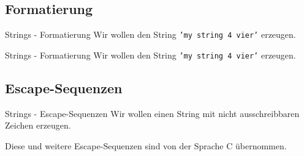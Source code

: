 \subsection{Formatierung}
\begin{frame}[fragile]{Strings - Formatierung}
	Wir wollen den String \alert{\texttt{'my string 4 vier'}} erzeugen.

	
\end{frame}

\begin{frame}[fragile]{Strings - Formatierung}
	Wir wollen den String \alert{\texttt{'my string 4 vier'}} erzeugen.
	
\end{frame}


\subsection{Escape-Sequenzen}
\begin{frame}[fragile]{Strings - Escape-Sequenzen}
	Wir wollen einen String mit nicht ausschreibbaren Zeichen erzeugen.
	
	Diese und weitere Escape-Sequenzen sind von der Sprache C übernommen.
\end{frame}



